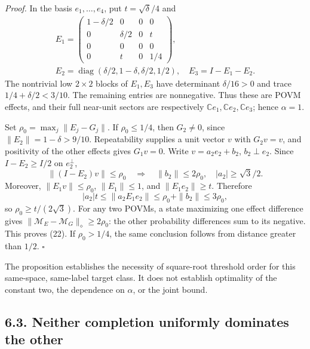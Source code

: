 \documentclass[
  11pt,
  a4paper,
]{article}
\begin{document}
\emph{Proof.} In the basis \(e_1,\ldots,e_4\), put \(t=\sqrt\delta/4\)
and \[\begin{gathered}
E_1=
\begin{pmatrix}
1-\delta/2&0&0&0\\
0&\delta/2&0&t\\
0&0&0&0\\
0&t&0&1/4
\end{pmatrix},\\
E_2=\operatorname{diag}(\delta/2,1-\delta,\delta/2,1/2),
\quad E_3=I-E_1-E_2.
\end{gathered}
\tag{23}\] The nontrivial low \(2\times2\) blocks of \(E_1,E_3\) have
determinant \(\delta/16>0\) and trace \(1/4+\delta/2<3/10\). The
remaining entries are nonnegative. Thus these are POVM effects, and
their full near-unit sectors are respectively
\(\mathbb Ce_1,\mathbb Ce_2,\mathbb Ce_3\); hence \(\alpha=1\).

Set \(\rho_0=\max_j\|E_j-G_j\|\). If \(\rho_0\le1/4\), then \(G_2\ne0\),
since \(\|E_2\|=1-\delta>9/10\). Repeatability supplies a unit vector
\(v\) with \(G_2v=v\), and positivity of the other effects gives
\(G_1v=0\). Write \(v=a_2e_2+b_2\), \(b_2\perp e_2\). Since
\(I-E_2\ge I/2\) on \(e_2^\perp\), \[\|(I-E_2)v\|\le\rho_0
\quad\Longrightarrow\quad
\|b_2\|\le2\rho_0,\quad |a_2|\ge\sqrt3/2.\] Moreover,
\(\|E_1v\|\le\rho_0\), \(\|E_1\|\le1\), and \(\|E_1e_2\|\ge t\).
Therefore \[|a_2|t\le\|a_2E_1e_2\|
\le\rho_0+\|b_2\|\le3\rho_0,\] so \(\rho_0\ge t/(2\sqrt3)\). For any two
POVMs, a state maximizing one effect difference gives
\(\|\mathcal M_E-\mathcal M_G\|_\diamond\ge2\rho_0\): the other
probability differences sum to its negative. This proves (22). If
\(\rho_0>1/4\), the same conclusion follows from distance greater than
\(1/2\). \(\square\)

The proposition establishes the necessity of square-root threshold order
for this same-space, same-label target class. It does not establish
optimality of the constant two, the dependence on \(\alpha\), or the
joint bound.

\subsection{6.3. Neither completion uniformly dominates the
other}\label{neither-completion-uniformly-dominates-the-other}
\end{document}
